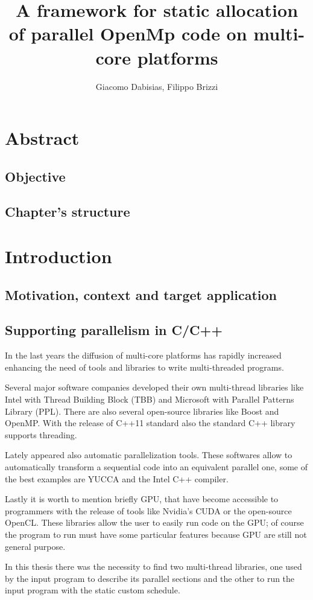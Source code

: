 \documentclass[a4paper,11pt,oneside]{book}
\author{Giacomo Dabisias, Filippo Brizzi}
\title{A framework for static allocation of parallel OpenMp code on multi-core platforms}
\begin{document}
\frontmatter
\tableofcontents

\chapter{Abstract}
\section{Objective}
\section{Chapter's structure}


\mainmatter
\chapter{Introduction}
\section{Motivation, context and target application}
\section{Supporting parallelism in C/C++}

In the last years the diffusion of multi-core platforms has rapidly increased enhancing the need of tools and libraries to write multi-threaded programs. 

Several major software companies developed their own multi-thread libraries like Intel with Thread Building Block (TBB) and Microsoft with Parallel Patterns Library (PPL). There are also several open-source libraries like Boost and OpenMP. With the release of C++11 standard also the standard C++ library supports threading.

Lately appeared also automatic parallelization tools. These softwares allow to automatically transform a sequential code into an equivalent parallel one, some of the best examples are YUCCA and the Intel C++ compiler. 

Lastly it is worth to mention briefly GPU, that have become accessible to programmers with the release of tools like Nvidia's CUDA or the open-source OpenCL. These libraries allow the user to easily run code on the GPU; of course the program to run must have some particular features because GPU are still not general purpose. 

In this thesis there was the necessity to find two multi-thread libraries, one used by the input program to describe its parallel sections and the other to run the input program with the static custom schedule. 
\end{document}

